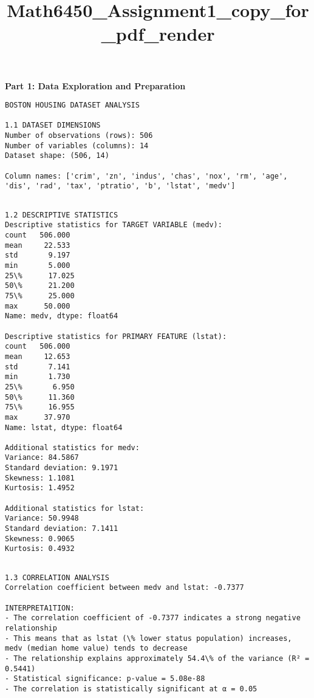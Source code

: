 \documentclass[8pt, twocolumn]{extarticle}
\title{Math6450\_Assignment1\_copy\_for\_pdf\_render}
\begin{document}
\fontsize{7pt}{8pt}\selectfont
    \maketitle
    
    
    \textbf{Part 1: Data Exploration and Preparation}
    \begin{Verbatim}[commandchars=\\\{\}]
BOSTON HOUSING DATASET ANALYSIS

1.1 DATASET DIMENSIONS
Number of observations (rows): 506
Number of variables (columns): 14
Dataset shape: (506, 14)

Column names: ['crim', 'zn', 'indus', 'chas', 'nox', 'rm', 'age', 'dis', 'rad', 'tax', 'ptratio', 'b', 'lstat', 'medv']
    \end{Verbatim}

    \begin{Verbatim}[commandchars=\\\{\}]

1.2 DESCRIPTIVE STATISTICS
Descriptive statistics for TARGET VARIABLE (medv):
count   506.000
mean     22.533
std       9.197
min       5.000
25\%      17.025
50\%      21.200
75\%      25.000
max      50.000
Name: medv, dtype: float64

Descriptive statistics for PRIMARY FEATURE (lstat):
count   506.000
mean     12.653
std       7.141
min       1.730
25\%       6.950
50\%      11.360
75\%      16.955
max      37.970
Name: lstat, dtype: float64

Additional statistics for medv:
Variance: 84.5867
Standard deviation: 9.1971
Skewness: 1.1081
Kurtosis: 1.4952

Additional statistics for lstat:
Variance: 50.9948
Standard deviation: 7.1411
Skewness: 0.9065
Kurtosis: 0.4932
    \end{Verbatim}

    \begin{Verbatim}[commandchars=\\\{\}]

1.3 CORRELATION ANALYSIS
Correlation coefficient between medv and lstat: -0.7377

INTERPRETA1TION:
- The correlation coefficient of -0.7377 indicates a strong negative relationship
- This means that as lstat (\% lower status population) increases, medv (median home value) tends to decrease
- The relationship explains approximately 54.4\% of the variance (R² = 0.5441)
- Statistical significance: p-value = 5.08e-88
- The correlation is statistically significant at α = 0.05
    \end{Verbatim}
\end{document}
